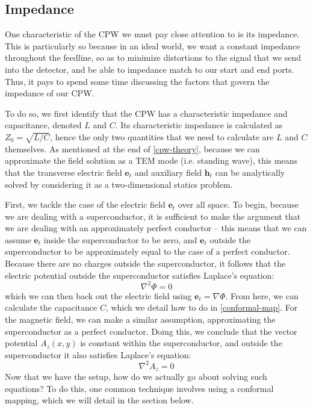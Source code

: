 \subsection{Impedance}
One characteristic of the CPW we must pay close attention to is its impedance. This is particularly so
because in an ideal world, we want a constant impedance throughout the feedline, so as to minimize
distortions to the signal that we send into the detector, and be able to impedance match to our start and end
ports. Thus, it pays to spend some time discussing the factors that govern the impedance of our CPW. 

To do so, we first identify that the CPW has a characteristic impedance and capacitance, denoted \( L \) and
\( C \). Its characteristic impedance is calculated as \( Z_0 = \sqrt{L / C} \), hence the only two
quantities that we need to calculate are \( L \) and \( C \) themselves. As mentioned at the 
end of \cref{cpw-theory}, because we can approximate the field solution as a TEM mode (i.e. standing wave), 
this means that the transverse electric field \( \mathbf{e}_t \) and auxiliary field \( \mathbf{h}_t \) can 
be analytically solved by considering it as a two-dimensional statics problem.

First, we tackle the case of the electric field \( \mathbf{e}_t \) over all space. 
To begin, because we are dealing with a superconductor, it is sufficient to make the argument that we are
dealing with an approximately perfect conductor -- this means that we can assume \( \mathbf{e}_t \) inside
the superconductor to be zero, and \( \mathbf{e}_t \) outside the superconductor to be approximately equal to
the case of a perfect conductor. Because there are no charges outside the superconductor, it follows that the
electric potential outside the superconductor satisfies Laplace's equation:
\[
	\nabla^2 \Phi = 0
\]
which we can then back out the electric field using \( \mathbf{e}_t = \nabla \Phi \). From here, we can
calculate the capacitance \( C \), which we detail how to do in \cref{conformal-map}. For the magnetic field,
we can make a similar assumption, approximating the superconductor as a perfect conductor. Doing this, we
conclude that the vector potential \( A_z(x, y) \) is constant within the superconductor, and outside the
superconductor it also satisfies Laplace's equation:
\[
	\nabla^2 A_z = 0
\]
Now that we have the setup, how do we actually go about solving such equations? To do this, one common
technique involves using a conformal mapping, which we will detail in the section below.      

